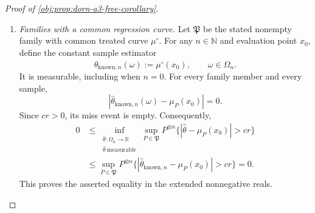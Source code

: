 \documentclass[11pt]{article}
\begin{document}
\begin{proof}[Proof of \cref{obj:prop:dorn-a3-free-corollary}]
\begin{enumerate}
For every transported sample \(\omega\) and every source-cube point \(z\),
\[
\left|
\widehat\mu_n(\omega,T^{-1}z)-\mu_P(z)
\right|
=
\left|
\widehat\mu_n(\omega,T^{-1}z)
-\mu_P(T(T^{-1}z))
\right|
\le Z_{n,P}(\omega).
\]
The source covariate law is supported on that cube, so
\[
\|\widehat\mu_n(\omega,\cdot)\circ T^{-1}-\mu_P\|_{L^\infty(P)}
\le Z_{n,P}(\omega).
\]
Markov's inequality and the common expectation bound now give
\[
\begin{aligned}
&Q_P^{\otimes n}\!\left\{
\|\widehat\mu_n\circ T^{-1}-\mu_P\|_{L^\infty(P)}
>c(\varepsilon)r_{\gamma,n}
\right\}
\\
&\qquad\le
Q_P^{\otimes n}\{Z_{n,P}>c(\varepsilon)r_{\gamma,n}\}
\le
\frac{\mathbb E_{Q_P^{\otimes n}}Z_{n,P}}
{(K/\varepsilon)r_{\gamma,n}}
\le\varepsilon.
\end{aligned}
\]
The sampling identity for \(\mathcal T_n\) expresses the same probability under \(P^{\otimes n}\) when the estimator is computed from the transported sample. Every bound is simultaneous over \(\gamma\in\Gamma\) and source tuples in \(\mathcal D_\gamma\).

\item \emph{Families with a common regression curve.}
Let \(\mathfrak P\) be the stated nonempty family with common treated curve \(\mu^\circ\). For any \(n\in\mathbb N\) and evaluation point \(x_0\), define the constant sample estimator
\[
\widehat\theta_{\mathrm{known},n}(\omega):=\mu^\circ(x_0),
\qquad \omega\in\Omega_n.
\]
It is measurable, including when \(n=0\). For every family member and every sample,
\[
|\widehat\theta_{\mathrm{known},n}(\omega)-\mu_P(x_0)|=0.
\]
Since \(cr>0\), its miss event is empty. Consequently,
\[
\begin{aligned}
0
&\le
\inf_{\substack{\widehat\theta:\Omega_n\to\mathbb R\\
\widehat\theta\ \mathrm{measurable}}}
\sup_{P\in\mathfrak P}
P^{\otimes n}\{|\widehat\theta-\mu_P(x_0)|>cr\}
\\
&\le
\sup_{P\in\mathfrak P}
P^{\otimes n}
\{|\widehat\theta_{\mathrm{known},n}-\mu_P(x_0)|>cr\}
=0.
\end{aligned}
\]
This proves the asserted equality in the extended nonnegative reals.


\end{enumerate}
\end{proof}
\end{document}
